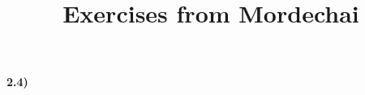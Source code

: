 \documentclass[letterpaper]{article}
\title{Exercises from Mordechai}
\begin{document}
\maketitle
\textbf{2.4)}
\end{document}

